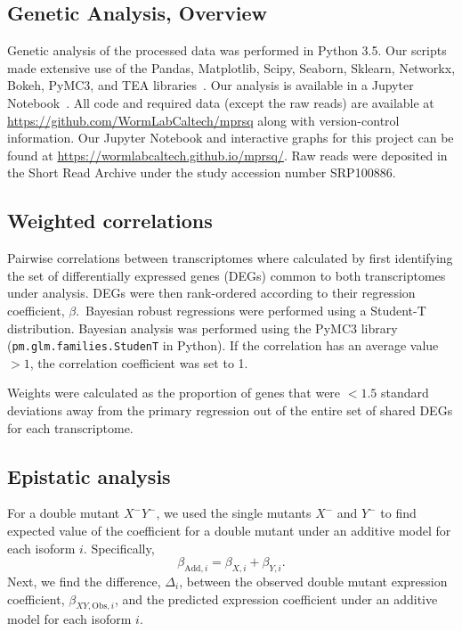 \documentclass[10pt, onecolumn]{article}
\begin{document}
\subsection*{Genetic Analysis, Overview}
Genetic analysis of the processed data was performed in Python 3.5. Our scripts
made extensive use of the Pandas, Matplotlib, Scipy, Seaborn, Sklearn, Networkx,
Bokeh, PyMC3, and TEA libraries~\cite{Team2014,McKinney2011,Oliphant2007,
Pedregosa2012,Salvatier2015,VanDerWalt2011,Hunter2007,Angeles-Albores2016,Waskom}.
Our analysis is available in a Jupyter Notebook~\cite{Perez2007}. All code and
required data (except the raw reads) are available at
\url{https://github.com/WormLabCaltech/mprsq} along with version-control
information. Our Jupyter Notebook and interactive graphs for this project can be
found at \url{https://wormlabcaltech.github.io/mprsq/}. Raw reads were deposited
in the Short Read Archive under the study accession number SRP100886.

\subsection*{Weighted correlations}
Pairwise correlations between transcriptomes where calculated by first identifying
the set of differentially expressed genes (DEGs) common to both transcriptomes
under analysis. DEGs were then rank-ordered according to their regression
coefficient, $\beta$.\ Bayesian robust regressions were performed using a
Student-T distribution. Bayesian analysis was performed using the PyMC3
library~\cite{Salvatier2015} (\texttt{pm.glm.families.StudenT} in Python). If
the correlation has an average value $>1$, the correlation coefficient was set
to 1.

Weights were calculated as the proportion of genes that were $<1.5$ standard
deviations away from the primary regression out of the entire set of shared DEGs
for each transcriptome.

\subsection*{Epistatic analysis}
For a double mutant $X^-Y^-$, we used the single mutants $X^-$ and $Y^-$ to find
expected value of the coefficient for a double mutant under an additive model for
each isoform $i$. Specifically,
\begin{equation}
  \beta_{\mathrm{Add},i} = \beta_{X,i} + \beta_{Y,i}.
\end{equation}
Next, we find the difference, $\Delta_i$, between the observed double mutant
expression coefficient, $\beta_{XY, \mathrm{Obs},i}$, and the predicted
expression coefficient under an additive model for each isoform $i$.
\end{document}
